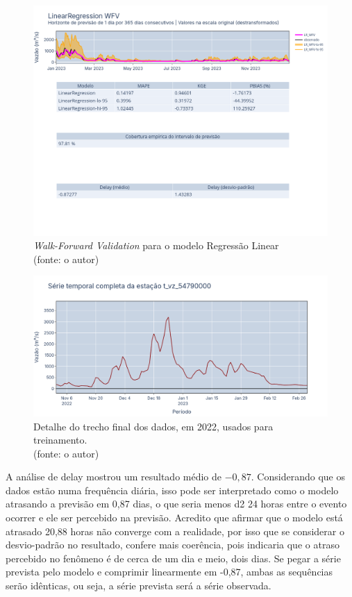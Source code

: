 \begin{figure}[!h]
	\centering
	\includegraphics[scale=0.33]{Figuras/jequiti/resultados/LR_WFV_LOG.png}
	\caption{\textit{Walk-Forward Validation} para o modelo Regressão Linear\\(fonte: o autor)}
	\label{fig:jequiti_LR_WFV_LOG}
\end{figure}

\begin{figure}[!h]
	\centering
	\includegraphics[scale=0.33]{Figuras/jequiti/resultados/LR_final_2022_detalhe.png}
	\caption{Detalhe do trecho final dos dados, em 2022, usados para treinamento.\\(fonte: o autor)}
	\label{fig:jequiti_LR_final_2022_detalhe}
\end{figure}

A análise de delay mostrou um resultado médio de $-0,87$. Considerando que os dados estão numa frequência diária, isso pode ser interpretado como o modelo atrasando a previsão em 0,87 dias, o que seria menos d2 24 horas entre o evento ocorrer e ele ser percebido na previsão. Acredito que afirmar que o modelo está atrasado 20,88 horas não converge com a realidade, por isso que se considerar o desvio-padrão no resultado, confere mais coerência, pois indicaria que o atraso percebido no fenômeno é de cerca de um dia e meio, dois dias. Se pegar a série prevista pelo modelo e comprimir linearmente em -0,87, ambas as sequências serão idênticas, ou seja, a série prevista será a série observada.

